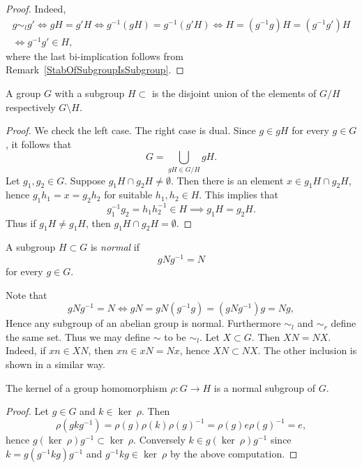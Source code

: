 \begin{proof}
    Indeed, 
    \begin{gather*}
        g \sim_l g' \iff gH = g'H \iff g^{-1}(gH) = g^{-1}(g'H) \iff  H = \left(g^{-1}g \right)H = \left(g^{-1}g'\right)H\\ \iff g^{-1}g'\in H, 
    \end{gather*}
    where the last bi-implication follows from Remark~\ref{StabOfSubgroupIsSubgroup}.
\end{proof}
\begin{proposition}\label{GroupsIsDisjointUnionOfCosets}
    A group $G$ with a subgroup $H\subset $ is the disjoint union of the elements of $G/H$ respectively $G\setminus H$.
\end{proposition}
\begin{proof}
    We check the left case. The right case is dual. Since $g\in gH$ for every $g\in G$, it follows that 
    $$G= \bigcup_{gH \in G/H} gH.$$
    Let $g_1,g_2\in G$. Suppose $g_1H\cap g_2H \neq \emptyset$. Then there is an element $x\in g_1H\cap g_2H$, hence $g_1h_1 = x =g_2h_2$ for suitable $h_1,h_2\in H$. This implies that 
    $$g_1^{-1}g_2 = h_1h_2^{-1} \in H \implies g_1H = g_2H.$$
    Thus if $g_1H \neq g_1H$, then $g_1H\cap g_2H = \emptyset$.
\end{proof}
\begin{definition}
    A subgroup $H\subset G$ is \textit{normal} if 
    $$g N g^{-1} = N$$
    for every $g\in G$.
\end{definition}
\begin{remark}\label{ReformulationOfNormalSubgroupAndAllSubgroupsOfAbelianGroupsAreNormal}
    Note that 
    $$gNg^{-1} = N \iff gN = gN(g^{-1}g)=(gNg^{-1})g = Ng,$$
    Hence any subgroup of an abelian group is normal. Furthermore $\sim_l$ and $\sim_r$ define the same set. Thus we may define $\sim$ to be $\sim_l$.
    Let $X\subset G$. Then $XN = NX$. Indeed, if $xn \in XN$, then $xn \in xN=Nx$, hence $XN\subset NX$. The other inclusion is shown in a similar way. 
\end{remark}
\begin{lemma}\label{KernelIsNormalSubgroup}
    The kernel of a group homomorphism $\rho : G \rightarrow H$ is a normal subgroup of $G$.
\end{lemma}
\begin{proof}
    Let $g\in G$ and $k \in \ker \ \rho$. Then 
    $$\rho\left(gkg^{-1}\right) = \rho(g)\rho(k)\rho(g)^{-1} = \rho(g)e\rho(g)^{-1} = e,$$
    hence $g(\ker \ \rho)g^{-1}\subset \ker \ \rho$. Conversely $k\in g (\ker \ \rho) g^{-1}$ since $k = g\left(g^{-1}kg\right)g^{-1}$ and $g^{-1}kg\in \ker \ \rho$ by the above computation.
\end{proof}

